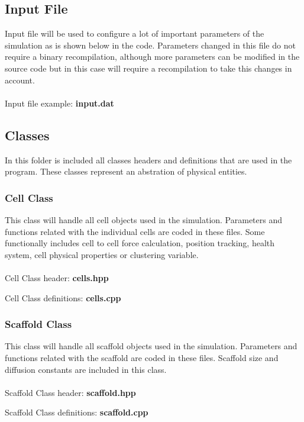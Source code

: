 \newpage
\subsection{Input File}
Input file will be used to configure a lot of important parameters of the simulation as is shown below in the code. Parameters changed in this file do not require a binary recompilation, although more parameters can be modified in the source code but in this case will require a recompilation to take this changes in account.\\
\\
Input file example: \textbf{input.dat}
 	


\newpage
\subsection{Classes} 
In this folder is included all classes headers and definitions that are used in the program. These classes represent an abstration of physical entities.

\subsubsection{Cell Class}
This class will handle all cell objects used in the simulation. Parameters and functions related with the individual cells are coded in these files. Some functionally includes cell to cell force calculation, position tracking, health system, cell physical properties or clustering variable.\\
\\
Cell Class header: \textbf{cells.hpp}
 	

Cell Class definitions: \textbf{cells.cpp}
 	


\newpage
\subsubsection{Scaffold Class}
This class will handle all scaffold objects used in the simulation. Parameters and functions related with the scaffold are coded in these files. Scaffold size and diffusion constants are included in this class.\\
\\
Scaffold Class header: \textbf{scaffold.hpp}
 

Scaffold Class definitions: \textbf{scaffold.cpp}
 


